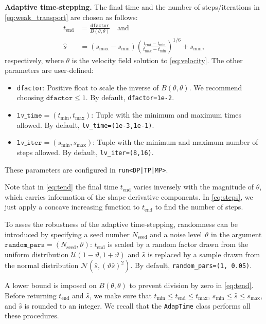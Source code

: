 \documentclass[iicol,pdflatex,sn-mathphys-ay]{sn-jnl}%
\theoremstyle{thmstyleone}%
\theoremstyle{thmstyletwo}%
\theoremstyle{thmstylethree}%
\begin{document}
\vspace*{0.5cm}
\noindent\textbf{Adaptive time-stepping.} 
The final time and the number of steps/iterations in \eqref{eq:weak_transport}
are chosen as follows:
\begin{align}
    t_{\text{end}} & = \tfrac{\texttt{dfactor}}{B(\theta, \theta)}\quad\text{and} \label{eq:tend} \\
    \hat{s} & =
	(s_{\max} - s_{\min}) \left( \tfrac{t_{\text{end}} - t_{\min}}{t_{\max} - t_{\min}} \right)^{1/6}
	+ s_{\min}, \label{eq:steps}
\end{align}
respectively, where
$\theta$ is the velocity field solution to \eqref{eq:velocity}.
The other parameters are user-defined:
\begin{itemize}
	\item \texttt{dfactor}:
	Positive float to scale the inverse of $B(\theta, \theta)$.
	We recommend choosing $\texttt{dfactor}\leq1$.
	By default, \texttt{dfactor=1e-2}.
	\item $\texttt{lv\_time} = (t_{\min}, t_{\max})$:
	Tuple with the minimum and maximum times allowed.
	By default, \texttt{lv\_time=(1e-3,1e-1)}.
	\item $\texttt{lv\_iter} = (s_{\min}, s_{\max})$:
	Tuple with the minimum and maximum number of steps allowed.
	By default, \texttt{lv\_iter=(8,16)}.
\end{itemize}
These parameters are configured in \texttt{run<DP|TP|MP>}.

Note that in \eqref{eq:tend} the final time $t_{\text{end}}$
varies inversely with the magnitude of $\theta$,
which carries information of the shape derivative components.
In \eqref{eq:steps}, we just apply a concave increasing function
to $t_{\text{end}}$ to find the number of steps.

To asses the robustness of the adaptive time-stepping,
randomness can be introduced by specifying
a seed number $N_\mathrm{seed}$ and a noise level $\vartheta$ in the argument
$\texttt{random\_pars} = (N_\mathrm{seed}, \vartheta)$:
$t_{\text{end}}$ is scaled by a random factor drawn from
the uniform distribution $\mathcal{U}(1 - \vartheta, 1 + \vartheta)$
and $\hat{s}$ is replaced by a sample drawn from the normal distribution
$\mathcal{N}(\hat{s}, (\vartheta \hat{s})^2)$.
By default, \texttt{random\_pars=(1, 0.05)}.

A lower bound is imposed on $B(\theta, \theta)$
to prevent division by zero in \eqref{eq:tend}.
Before returning $t_{\text{end}}$ and $\hat{s}$, we make sure that
$t_{\min}\leq t_{\text{end}} \leq t_{\max}$,
$s_{\min}\leq \hat{s} \leq s_{\max}$,
and $\hat{s}$ is rounded to an integer.
We recall that the \texttt{AdapTime} class 
performs all these procedures.
\end{document}
